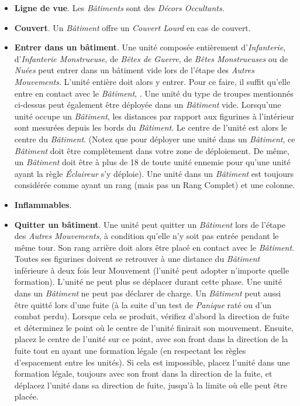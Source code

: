 \begin{itemize}[label={-}]
\item \textbf{Ligne de vue}. Les \emph{Bâtiments} sont des \emph{Décors Occultants}.
\item \textbf{Couvert}. Un \emph{Bâtiment} offre un \emph{Couvert Lourd} en cas de couvert.
\item \textbf{Entrer dans un bâtiment}. Une unité composée entièrement d'\emph{Infanterie}, d'\emph{Infanterie Monstrueuse}, de \emph{Bêtes de Guerre}, de \emph{Bêtes Monstrueuses} ou de \emph{Nuées} peut entrer dans un bâtiment vide lors de l'étape des \emph{Autres Mouvements}. L'unité entière doit alors y entrer. Pour ce faire, il suffit qu'elle entre en contact avec le \emph{Bâtiment}, . Une unité du type de troupes mentionnés ci-dessus peut également être déployée dans un \emph{Bâtiment} vide. Lorsqu'une unité occupe un \emph{Bâtiment}, les distances par rapport aux figurines à l'intérieur sont mesurées depuis les bords du \emph{Bâtiment}. Le centre de l'unité est alors le centre du \emph{Bâtiment}. (Notez que pour déployer une unité dans un \emph{Bâtiment}, ce \emph{Bâtiment} doit être complètement dans votre zone de déploiement. De même, un \emph{Bâtiment} doit être à plus de 18{\pouce} de toute unité ennemie pour qu'une unité ayant la règle \emph{Éclaireur} s'y déploie). Une unité dans un \emph{Bâtiment} est toujours considérée comme ayant un rang (mais pas un Rang Complet) et une colonne.
\item \textbf{Inflammables}. 
\item \textbf{Quitter un bâtiment}. Une unité peut quitter un \emph{Bâtiment} lors de l'étape des \emph{Autres Mouvements}, à condition qu'elle n'y soit pas entrée pendant le même tour. Son rang arrière doit alors être placé en contact avec le \emph{Bâtiment}. Toutes ses figurines doivent se retrouver à une distance du \emph{Bâtiment} inférieure à deux fois leur Mouvement (l'unité peut adopter n'importe quelle formation). L'unité ne peut plus se déplacer durant cette phase. Une unité dans un \emph{Bâtiment} ne peut pas déclarer de charge. Un \emph{Bâtiment} peut aussi être quitté lors d'une fuite (à la suite d'un test de \emph{Panique} raté ou d'un combat perdu). Lorsque cela se produit, vérifiez d'abord la direction de fuite et déterminez le point où le centre de l’unité finirait son mouvement. Ensuite, placez le centre de l'unité sur ce point, avec son front dans la direction de la fuite tout en ayant une formation légale (en respectant les règles d'espacement entre les unités). Si cela est impossible, placez l'unité dans une formation légale, toujours avec son front dans la direction de la fuite, et déplacez l'unité dans sa direction de fuite, jusqu'à la limite où elle peut être placée.

\end{itemize}
